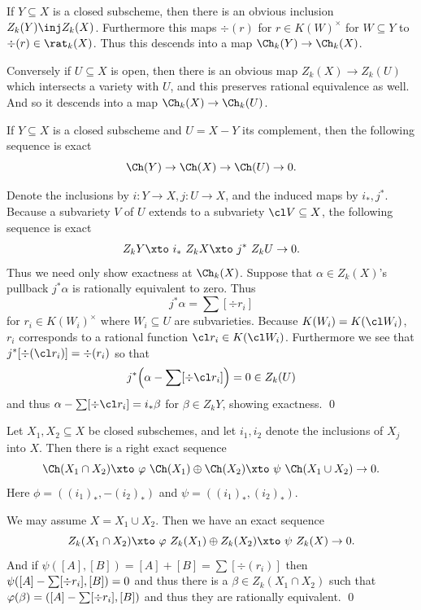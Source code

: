 If $Y\subseteq X$ is a closed subscheme, then there is an obvious inclusion $Z_k(Y)\inj Z_k(X)$.
Furthermore this maps $\div(r)$ for $r\in K(W)^\times$ for $W\subseteq Y$ to $\div(r)\in\rat_k(X)$.
Thus this descends into a map $\Ch_k(Y)\to\Ch_k(X)$.

Conversely if $U\subseteq X$ is open, then there is an obvious map $Z_k(X)\to Z_k(U)$ which intersects a
variety with $U$, and this preserves rational equivalence as well.
And so it descends into a map $\Ch_k(X)\to\Ch_k(U)$.

\bthrm[name={excision}, title={Excision}]

    If $Y\subseteq X$ is a closed subscheme and $U=X-Y$ its complement, then the following sequence is
    exact
    $$ \Ch(Y) \to \Ch(X) \to \Ch(U) \to 0 . $$

\ethrm

\bproof

    Denote the inclusions by $i\colon Y\to X,j\colon U\to X$, and the induced maps by $i_*,j^*$.
    Because a subvariety $V$ of $U$ extends to a subvariety $\cl V\subseteq X$, the following sequence is
    exact
    $$ Z_kY \xtos{i_*} Z_kX \xtos{j^*} Z_kU \to 0 . $$
    Thus we need only show exactness at $\Ch_k(X)$.
    Suppose that $\alpha\in Z_k(X)$'s pullback $j^*\alpha$ is rationally equivalent to zero.
    Thus
    $$ j^*\alpha = \sum[\div r_i] $$
    for $r_i\in K(W_i)^\times$ where $W_i\subseteq U$ are subvarieties.
    Because $K(W_i)=K(\cl W_i)$, $r_i$ corresponds to a rational function $\cl r_i\in K(\cl W_i)$.
    Furthermore we see that $j^*[\div(\cl r_i)]=\div(r_i)$ so that
    $$ j^*\parens{\alpha-\sum[\div\cl r_i]} = 0 \in Z_k(U) $$
    and thus $\alpha-\sum[\div\cl r_i]=i_*\beta$ for $\beta\in Z_kY$, showing exactness.
    \qed

\eproof

\bthrm[name={mayerviet}, title={Mayer-Vietoris}]

    Let $X_1,X_2\subseteq X$ be closed subschemes, and let $i_1,i_2$ denote the inclusions of $X_j$ into $X$.
    Then there is a right exact sequence
    $$ \Ch(X_1\cap X_2) \xtos\phi \Ch(X_1)\oplus\Ch(X_2) \xtos\psi \Ch(X_1\cup X_2) \to 0 . $$
    Here $\phi=((i_1)_*,-(i_2)_*)$ and $\psi=((i_1)_*,(i_2)_*)$.

\ethrm

\bproof

    We may assume $X=X_1\cup X_2$.
    Then we have an exact sequence
    $$ Z_k(X_1\cap X_2) \xtos\phi Z_k(X_1)\oplus Z_k(X_2) \xtos\psi Z_k(X) \to 0 . $$
    And if $\psi([A],[B])=[A]+[B]=\sum[\div(r_i)]$ then $\psi\mathopen{}\mathclose{\left([A]-\sum[\div r_i],[B]\right)}=0$ and thus
    there is a $\beta\in Z_k(X_1\cap X_2)$ such that $\varphi(\beta)=\mathopen{}\mathclose{\left([A]-\sum[\div r_i],[B]\right)}$ and
    thus they are rationally equivalent.
    \qed

